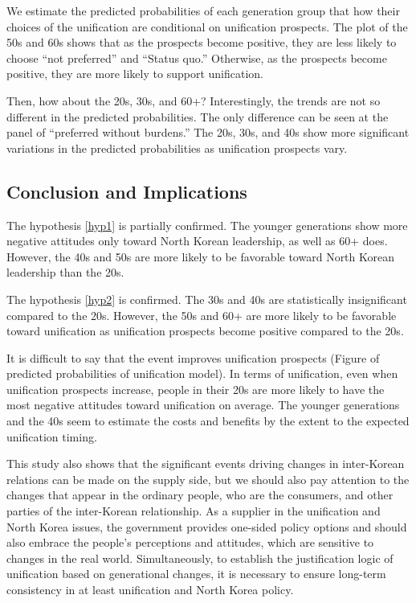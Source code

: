 \documentclass[letterpaper,10pt,twocolumn,twoside,]{pinp}
\begin{document}
We estimate the predicted probabilities of each generation group that
how their choices of the unification are conditional on unification
prospects. The plot of the 50s and 60s shows that as the prospects
become positive, they are less likely to choose ``not preferred'' and
``Status quo.'' Otherwise, as the prospects become positive, they are
more likely to support unification.

Then, how about the 20s, 30s, and 60+? Interestingly, the trends are not
so different in the predicted probabilities. The only difference can be
seen at the panel of ``preferred without burdens.'' The 20s, 30s, and
40s show more significant variations in the predicted probabilities as
unification prospects vary.

\hypertarget{conclusion-and-implications}{%
\subsection{Conclusion and
Implications}\label{conclusion-and-implications}}

The hypothesis \ref{hyp1} is partially confirmed. The younger
generations show more negative attitudes only toward North Korean
leadership, as well as 60+ does. However, the 40s and 50s are more
likely to be favorable toward North Korean leadership than the 20s.

The hypothesis \ref{hyp2} is confirmed. The 30s and 40s are
statistically insignificant compared to the 20s. However, the 50s and
60+ are more likely to be favorable toward unification as unification
prospects become positive compared to the 20s.

It is difficult to say that the event improves unification prospects
(Figure of predicted probabilities of unification model). In terms of
unification, even when unification prospects increase, people in their
20s are more likely to have the most negative attitudes toward
unification on average. The younger generations and the 40s seem to
estimate the costs and benefits by the extent to the expected
unification timing.

This study also shows that the significant events driving changes in
inter-Korean relations can be made on the supply side, but we should
also pay attention to the changes that appear in the ordinary people,
who are the consumers, and other parties of the inter-Korean
relationship. As a supplier in the unification and North Korea issues,
the government provides one-sided policy options and should also embrace
the people's perceptions and attitudes, which are sensitive to changes
in the real world. Simultaneously, to establish the justification logic
of unification based on generational changes, it is necessary to ensure
long-term consistency in at least unification and North Korea policy.





\end{document}

